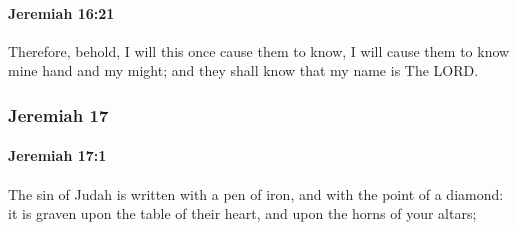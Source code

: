 		\paragraph{Jeremiah 16:21} %
			\label{JEREMIAH-16-21}

			Therefore, behold, I will this once cause them to know, I will cause them to know mine hand and my might; and they shall know that my name is The LORD.

	\subsubsection{Jeremiah 17} %
		\label{JEREMIAH-17}

		\paragraph{Jeremiah 17:1} %
			\label{JEREMIAH-17-1}

			The sin of Judah is written with a pen of iron, and with the point of a diamond: it is graven upon the table of their heart, and upon the horns of your altars;

